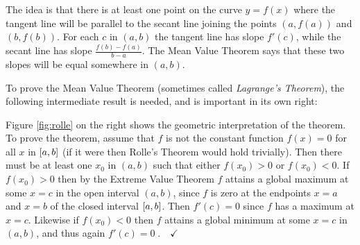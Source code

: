 The idea is that there is at least one point on the curve $y=f(x)$ where
the tangent line will be parallel to the secant line joining the points
$(a,f(a))$ and $(b,f(b))$. For each $c$ in $(a,b)$ the tangent line has slope
$f'(c)$, while the secant line has slope $\frac{f(b) - f(a)}{b - a}$. The Mean
Value Theorem says that these two slopes will be equal somewhere in $(a,b)$.

To prove the Mean Value Theorem (sometimes called \emph{Lagrange's Theorem}),
the following intermediate result is needed, and is important in its own right:
\newpage
{}

\piccaption[]{\label{fig:rolle}}
Figure \ref{fig:rolle} on the right shows the geometric interpretation of the
theorem. To prove the theorem, assume that $f$ is not the constant function
$f(x) = 0$ for all $x$ in $\lbrack a,b \rbrack$ (if it were then Rolle's Theorem would
hold trivially). Then there must be at least one $x_0$ in $(a,b)$ such that
either $f(x_0) > 0$ or $f(x_0) < 0$. If $f(x_0) > 0$ then by the Extreme Value
Theorem $f$ attains a global maximum at some $x=c$ in the open interval
$(a,b)$, since $f$ is zero at the endpoints $x=a$ and $x=b$ of the closed
interval $\lbrack a,b \rbrack$. Then $f'(c)=0$ since $f$ has a maximum at $x=c$.
Likewise if $f(x_0) < 0$ then $f$ attains a global minimum at some $x=c$ in
$(a,b)$, and thus again $f'(c)=0\;.\quad\checkmark$

